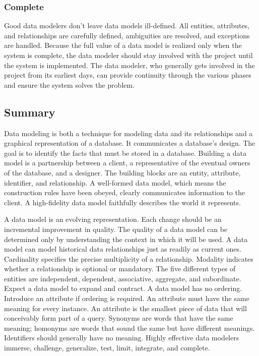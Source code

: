 \documentclass[
]{article}
\begin{document}
\hypertarget{complete}{%
\subsubsection*{Complete}\label{complete}}

Good data modelers don't leave data models ill-defined. All entities,
attributes, and relationships are carefully defined, ambiguities are
resolved, and exceptions are handled. Because the full value of a data
model is realized only when the system is complete, the data modeler
should stay involved with the project until the system is implemented.
The data modeler, who generally gets involved in the project from its
earliest days, can provide continuity through the various phases and
ensure the system solves the problem.

\hypertarget{summary-7}{%
\subsection*{Summary}\label{summary-7}}

Data modeling is both a technique for modeling data and its
relationships and a graphical representation of a database. It
communicates a database's design. The goal is to identify the facts that
must be stored in a database. Building a data model is a partnership
between a client, a representative of the eventual owners of the
database, and a designer. The building blocks are an entity, attribute,
identifier, and relationship. A well-formed data model, which means the
construction rules have been obeyed, clearly communicates information to
the client. A high-fidelity data model faithfully describes the world it
represents.

A data model is an evolving representation. Each change should be an
incremental improvement in quality. The quality of a data model can be
determined only by understanding the context in which it will be used. A
data model can model historical data relationships just as readily as
current ones. Cardinality specifies the precise multiplicity of a
relationship. Modality indicates whether a relationship is optional or
mandatory. The five different types of entities are independent,
dependent, associative, aggregate, and subordinate. Expect a data model
to expand and contract. A data model has no ordering. Introduce an
attribute if ordering is required. An attribute must have the same
meaning for every instance. An attribute is the smallest piece of data
that will conceivably form part of a query. Synonyms are words that have
the same meaning; homonyms are words that sound the same but have
different meanings. Identifiers should generally have no meaning. Highly
effective data modelers immerse, challenge, generalize, test, limit,
integrate, and complete.
\end{document}
